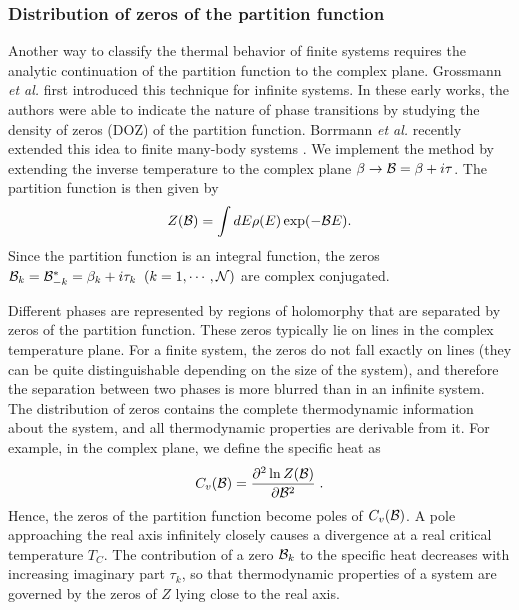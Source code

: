 \documentclass[rmp,preprint,aps,floatfix]{revtex4}
\begin{document}
\subsubsection{Distribution of zeros of the partition function}

\label{subsec:doz}

Another way to classify the thermal behavior of finite systems 
requires the analytic continuation of the partition function to the
complex plane. Grossmann {\it et al.} \cite{gr67,gr69,gl69} first 
introduced this technique for infinite systems. In these early works,
the authors were able to indicate the nature of phase transitions 
by studying the density of zeros (DOZ) of the partition function. 
Borrmann {\it et al.} recently extended this idea to finite many-body
systems \cite{bmh00}. We implement the method by extending 
the inverse temperature to the complex plane $\beta \rightarrow {\cal B}=
\beta +i\tau$. The partition function is then given by
\begin{equation}
Z({\cal B})= \int dE \rho(E) \exp(-{\cal B}E).
\end{equation}
Since the partition function is an integral function, the zeros 
${\cal B}_k = {\cal B}_{-k}^*=\beta_k + i\tau_k \;\; (k =1,\cdots, {\cal N})$
are complex conjugated. 

Different phases are represented by regions of holomorphy that are
separated by zeros of the partition function. These zeros typically lie
on lines in the complex temperature plane. For a finite system, the zeros
do not fall exactly on lines (they can be quite distinguishable depending
on the size of the system), and therefore the separation between two 
phases is more blurred than in an infinite system. The distribution of zeros
contains the complete thermodynamic information about the system, and 
all thermodynamic properties are derivable from it. For example, in the
complex plane, we define the specific heat as
\begin{equation}
C_v({\cal B})=\frac{\partial^2 \ln Z({\cal B})}{\partial {\cal B}^2}\;.
\end{equation}
Hence, the zeros of the partition function become poles of $C_v({\cal B})$. 
A pole approaching the real axis  infinitely closely causes a divergence
at a real critical temperature $T_C$. The contribution of a zero ${\cal B}_k$
to the specific heat decreases with increasing imaginary part $\tau_k$, so 
that thermodynamic properties of a system are governed by the zeros of 
$Z$ lying close to the real axis. 
\end{document}
